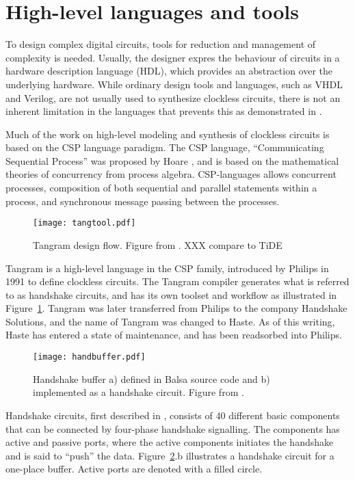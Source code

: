 \section{High-level languages and tools}
\label{sec:tools}

To design complex digital circuits, tools for reduction and management
of complexity is needed. Usually, the designer expres the behaviour of
circuits in a hardware description language (HDL), which provides an
abstraction over the underlying hardware. While ordinary design tools
and languages, such as VHDL and Verilog, are not usually used to
synthesize clockless circuits, there is not an inherent limitation in
the languages that prevents this as demonstrated in
\cite[pp. 135-137]{sparso}.

Much of the work on high-level modeling and synthesis of clockless
circuits is based on the CSP language paradigm. The CSP language,
``Communicating Sequential Process'' was proposed by Hoare \cite{csp},
and is based on the mathematical theories of concurrency from process
algebra. CSP-languages allows concurrent processes, composition of
both sequential and parallel statements within a process, and
synchronous message passing between the processes.

\begin{figure}[htbp]
  \centering
  \texttt{[image: tangtool.pdf]}
  \caption{Tangram design flow. Figure from \cite{fullscan}. XXX compare to TiDE}
  \label{fig:tangtool}
\end{figure}

Tangram is a high-level language in the CSP family, introduced by
Philips in 1991 to define clockless circuits. The Tangram compiler
generates what is referred to as handshake circuits, and has its own
toolset and workflow as illustrated in
Figure~\ref{fig:tangtool}. Tangram was later transferred from Philips
to the company Handshake Solutions, and the name of Tangram was
changed to Haste. As of this writing, Haste has entered a state of
maintenance, and has been readsorbed into Philips.

\begin{figure}[htbp]
  \centering
  \texttt{[image: handbuffer.pdf]}
  \caption{Handshake buffer a) defined in Balsa source code and b)
    implemented as a handshake circuit. Figure from
    \cite{taylor2008automatic}.}
  \label{fig:handbuffer}
\end{figure}

Handshake circuits, first described in \cite{12, teakxxx}, consists of
40 different basic components that can be connected by four-phase
handshake signalling. The components has active and passive ports,
where the active components initiates the handshake and is said to
``push'' the data. Figure~\ref{fig:handbuffer}.b illustrates a
handshake circuit for a one-place buffer. Active ports are denoted
with a filled circle.

